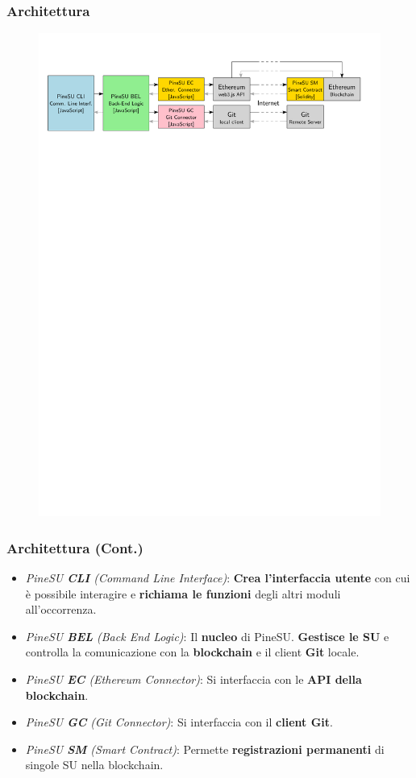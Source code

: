\documentclass{beamer}
\begin{document}
\begin{frame}
	\frametitle{Architettura}
	\centering
	\begin{figure}
		\includegraphics[width=\textwidth]{figures/pineSU-architecture.pdf}
	\end{figure}
\end{frame}

\begin{frame}
	\frametitle{Architettura (Cont.)}
	\begin{itemize}
		\item \emph{PineSU \textbf{CLI} (Command Line Interface)}: \textbf{Crea l'interfaccia utente} con cui è possibile
			interagire e \textbf{richiama le funzioni} degli altri moduli all'occorrenza.
		\item \emph{PineSU \textbf{BEL} (Back End Logic)}: Il \textbf{nucleo} di PineSU.
		\textbf{Gestisce le SU} e controlla la comunicazione con la \textbf{blockchain} e il client \textbf{Git} locale.
		\item \emph{PineSU \textbf{EC} (Ethereum Connector)}: Si interfaccia con le \textbf{API della blockchain}. 
		\item \emph{PineSU \textbf{GC} (Git Connector)}: Si interfaccia con il \textbf{client Git}. 
		\item \emph{PineSU \textbf{SM} (Smart Contract)}: Permette \textbf{registrazioni permanenti} di singole SU nella blockchain.
	\end{itemize}
\end{frame}
\end{document}
